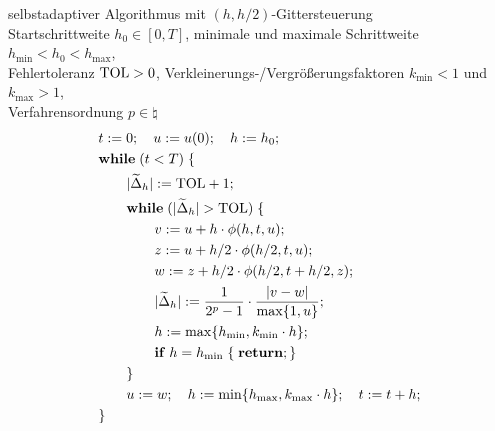 \begin{Def}{selbstadaptiver Algorithmus mit $(h, h/2)$-Gittersteuerung}\\
    Startschrittweite $h_0 \in [0, T]$,\qquad
    minimale und maximale Schrittweite $h_{\min} < h_0 < h_{\max}$,\\
    Fehlertoleranz $\text{TOL} > 0$,\qquad
    Verkleinerungs-/Vergrößerungsfaktoren
    $k_{\min} < 1$ und $k_{\max} > 1$,\\
    Verfahrensordnung $p \in \natural$
    \begin{align*}
        &t := 0;\quad
        u := u(0);\quad
        h := h_0;\\
        &\mathbf{while}\; (t < T)\; \{\\
        &\qquad|\widetilde{\Delta}_h| := \text{TOL} + 1;\;\\
        &\qquad\mathbf{while}\; (|\widetilde{\Delta}_h| > \text{TOL})\; \{\\
        &\qquad\qquad v := u + h \cdot \phi(h, t, u);\\
        &\qquad\qquad z := u + h/2 \cdot \phi(h/2, t, u);\\
        &\qquad\qquad w := z + h/2 \cdot \phi(h/2, t + h/2, z);\\
        &\qquad\qquad |\widetilde{\Delta}_h| := \frac{1}{2^p - 1} \cdot
                     \frac{|v - w|}{\max\{1, u\}};\\
        &\qquad\qquad h := \max\{h_{\min}, k_{\min} \cdot h\};\\
        &\qquad\qquad\mathbf{if}\; h = h_{\min}\; \{\; \mathbf{return}; \}\\
        &\qquad\}\\
        &\qquad u := w;\quad
        h := \min\{h_{\max}, k_{\max} \cdot h\};\quad
        t := t + h;\\
        &\}
    \end{align*}
\end{Def}

\pagebreak


